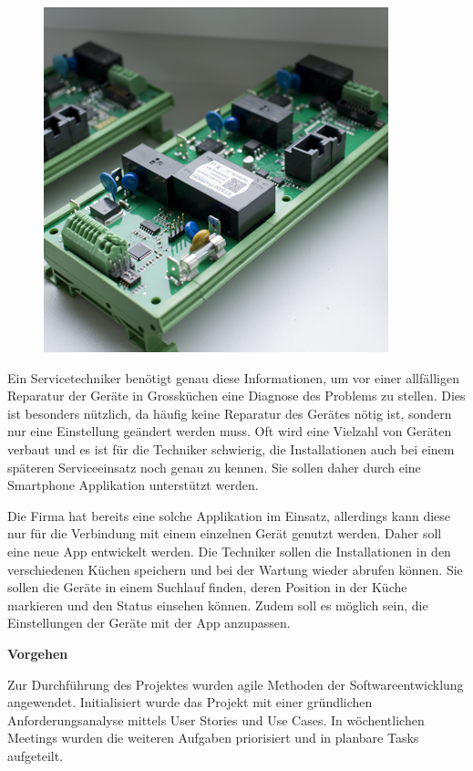 \begin{figure}
	\vspace{-0.5cm}
	\begin{center}
		\includegraphics[scale=1]{start/img/img_7689}
	\end{center}
	\vspace{-0.5cm}
\end{figure}

Ein Servicetechniker benötigt genau diese Informationen, um vor einer allfälligen Reparatur der Geräte in Grossküchen eine Diagnose des Problems zu stellen. Dies ist besonders nützlich, da häufig keine Reparatur des Gerätes nötig ist, sondern nur eine Einstellung geändert werden muss. Oft wird eine Vielzahl von Geräten verbaut und es ist für die Techniker schwierig, die Installationen auch bei einem späteren Serviceeinsatz noch genau zu kennen. Sie sollen daher durch eine Smartphone Applikation unterstützt werden.

Die Firma hat bereits eine solche Applikation im Einsatz, allerdings kann diese nur für die Verbindung mit einem einzelnen Gerät genutzt werden. Daher soll eine neue App entwickelt werden. Die Techniker sollen die Installationen in den verschiedenen Küchen speichern und bei der Wartung wieder abrufen können. Sie sollen die Geräte in einem Suchlauf finden, deren Position in der Küche markieren und den Status einsehen können. Zudem soll es möglich sein, die Einstellungen der Geräte mit der App anzupassen.

\textbf{Vorgehen}

Zur Durchführung des Projektes wurden agile Methoden der Softwareentwicklung angewendet. Initialisiert wurde das Projekt mit einer gründlichen Anforderungsanalyse mittels User Stories und Use Cases.  In  wöchentlichen Meetings wurden die weiteren Aufgaben priorisiert und in planbare Tasks aufgeteilt.

